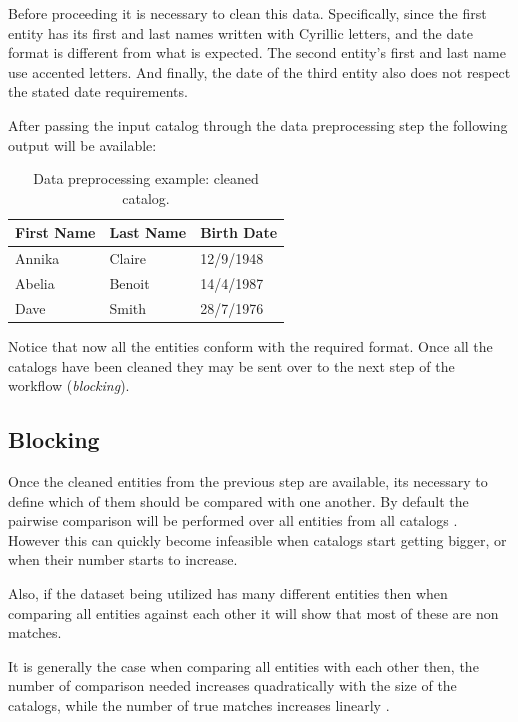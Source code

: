 \documentclass[epsfig,a4paper,11pt,titlepage,twoside,openany]{book}
\begin{document}
Before proceeding it is necessary to clean this data. Specifically, since the first entity has its first and last names written with Cyrillic letters, and the date format is different from what is expected. The second entity's first and last name use accented letters. And finally, the date of the third entity also does not respect the stated date requirements.

After passing the input catalog through the data preprocessing step the following output will be available:

\begin{table}[H]
  \centering

  \begin{tabular}{l|l|l}
    First Name & Last Name & Birth Date \\ \hline
    Annika     & Claire    & 12/9/1948  \\
    Abelia     & Benoit    & 14/4/1987  \\
    Dave       & Smith     & 28/7/1976   
  \end{tabular}
  
  \caption{Data preprocessing example: cleaned catalog.}
  \label{tab:data-prepr-ex-cleaned}
\end{table}

Notice that now all the entities conform with the required format. Once all the
catalogs have been cleaned they may be sent over to the next step of the workflow
(\textit{blocking}).



\subsection{Blocking}
\label{sec:rl-workflow-blocking}

Once the cleaned entities from the previous step are available, its necessary to define which
of them should be compared with one another. By default the pairwise comparison will be performed over all entities from all catalogs . However this can quickly
become infeasible when catalogs start getting bigger, or when their number starts to increase. 

Also, if the dataset being utilized has many different
entities then when comparing all entities against each other it will show that most of these are non matches.


It is generally the case when comparing all entities with each other then,
the number of comparison needed increases quadratically with the size of the
catalogs, while the number of true matches increases linearly
\cite{christen12_data}.
\end{document}
